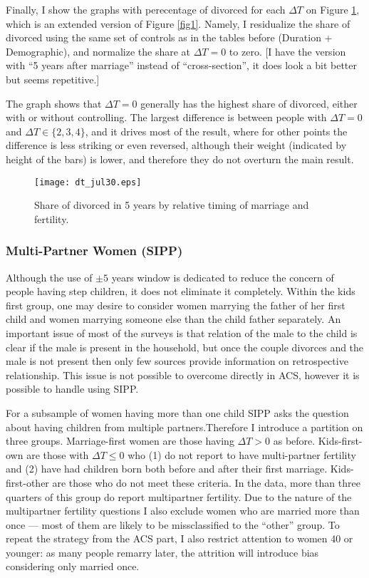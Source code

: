 \documentclass[12pt,letter]{article}
\begin{document}
Finally, I show the graphs with perecentage of divorced for each $\Delta T$ on Figure \ref{fig2}, which is an extended version of Figure \ref{fig1}. Namely, I residualize the share of divorced using the same set of controls as in the tables before (Duration + Demographic), and normalize the share at $\Delta T = 0$ to zero. [I have the version with ``5 years after marriage'' instead of ``cross-section'', it does look a bit better but seems repetitive.]

The graph shows that $\Delta T = 0$ generally has the highest share of divorced, either with or without controlling. The largest difference is between people with $\Delta T = 0$ and $\Delta T \in \{2,3,4\}$, and it drives most of the result, where for other points the difference is less striking or even reversed, although their weight (indicated by height of the bars) is lower, and therefore they do not overturn the main result.

\begin{figure}[h!]
\begin{center}
\texttt{[image: dt\_jul30.eps]}
\caption{Share of divorced in 5 years by relative timing of marriage and fertility.\label{fig2}}
\end{center}
\end{figure}




\subsubsection{Multi-Partner Women (SIPP)}
Although the use of $\pm 5$ years window is dedicated to reduce the concern of people having step children, it does not eliminate it completely. Within the kids first group, one may desire to consider women marrying the father of her first child and women marrying someone else than the child father separately. An important issue of most of the surveys is that relation of the male to the child is clear if the male is present in the household, but once the couple divorces and the male is not present then only few sources provide information on retrospective relationship. This issue is not possible to overcome directly in ACS, however it is possible to handle using SIPP.

For a subsample of women having more than one child SIPP asks the question about having children from multiple partners.Therefore I introduce a partition on three groups. Marriage-first women are those having $\Delta T > 0$ as before. Kids-first-own are those with $\Delta T \leq 0$ who (1) do not report to have multi-partner fertility and (2) have had children born both before and after their first marriage. Kids-first-other are those who do not meet these criteria. In the data, more than three quarters of this group do report multipartner fertility. Due to the nature of the multipartner fertility questions I also exclude women who are married more than once --- most of them are likely to be missclassified to the ``other'' group. To repeat the strategy from the ACS part, I also restrict attention to women 40 or younger: as many people remarry later, the attrition will introduce bias considering only married once.
\end{document}
